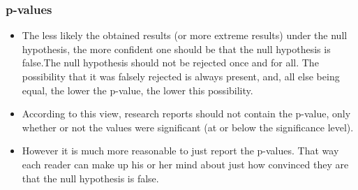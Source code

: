 \begin{frame}
\frametitle{p-values}
\begin{itemize}
\item The less likely the obtained results (or more extreme results) under the null hypothesis, the more confident one should be that the null hypothesis is false.The null hypothesis should not be rejected once and for all. The possibility that it was falsely rejected is always present, and, all else being equal, the lower the p-value, the lower this possibility.
\item According to this view, research reports should not contain the p-value, only whether or not the values were significant (at or below the significance level).
\item
However it is much more reasonable to just report the p-values. That way each reader can make up his or her mind about just how convinced they are that the null hypothesis is false.
\end{itemize}
\end{frame}























